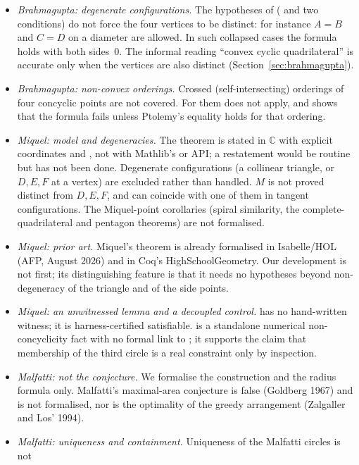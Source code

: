 \documentclass[11pt]{article}
\theoremstyle{definition}
\theoremstyle{remark}
\newcommand{\CC}{\mathbb{C}}
\begin{document}
\begin{itemize}
\item \emph{Brahmagupta: degenerate configurations.} The hypotheses of
 ( and two  conditions) do not force the
four vertices to be distinct: for instance $A=B$ and $C=D$ on a diameter are allowed. In such
collapsed cases the formula holds with both sides~$0$. The informal reading ``convex cyclic
quadrilateral'' is accurate only when the vertices are also distinct (Section~\ref{sec:brahmagupta}).
\item \emph{Brahmagupta: non-convex orderings.} Crossed (self-intersecting) orderings of four
concyclic points are not covered. For them  does not apply, and
 shows that the formula fails unless Ptolemy's equality
holds for that ordering.
\item \emph{Miquel: model and degeneracies.} The theorem is stated in $\CC$ with explicit
coordinates and , not with Mathlib's  or
 API; a restatement would be routine but has not been done.
Degenerate configurations (a collinear triangle, or $D,E,F$ at a vertex) are excluded rather than
handled. $M$ is not proved distinct from $D,E,F$, and can coincide with one of them in tangent
configurations. The Miquel-point corollaries (spiral similarity, the complete-quadrilateral and
pentagon theorems) are not formalised.
\item \emph{Miquel: prior art.} Miquel's theorem is already formalised in Isabelle/HOL (AFP,
August 2026) and in Coq's HighSchoolGeometry. Our development is not first; its distinguishing
feature is that it needs no hypotheses beyond non-degeneracy of the triangle and of the side points.
\item \emph{Miquel: an unwitnessed lemma and a decoupled control.}  has no
hand-written witness; it is harness-certified satisfiable.  is a standalone numerical
non-concyclicity fact with no formal link to ; it supports the claim
that membership of the third circle is a real constraint only by inspection.
\item \emph{Malfatti: not the conjecture.} We formalise the construction and the radius formula
only. Malfatti's maximal-area conjecture is false (Goldberg 1967) and is not formalised, nor is the
optimality of the greedy arrangement (Zalgaller and Los' 1994).
\item \emph{Malfatti: uniqueness and containment.} Uniqueness of the Malfatti circles is not

\end{itemize}
\end{document}
